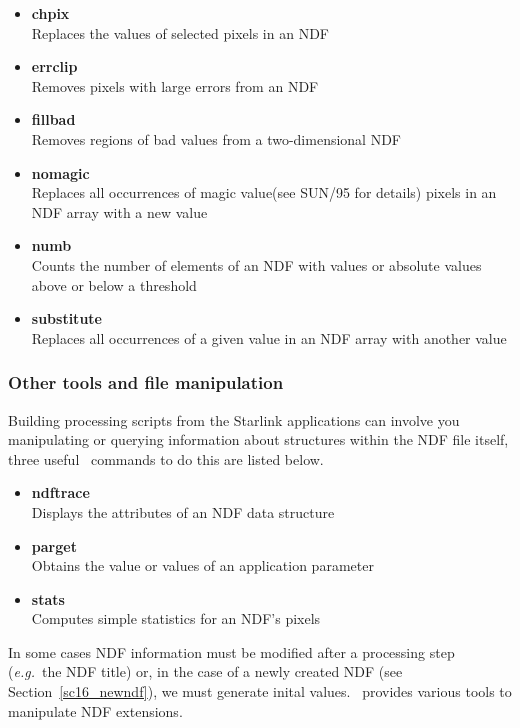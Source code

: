 \documentclass[twoside,11pt]{article}
\newcommand{\htmlref}[2]{#1}
\newcommand{\xref}[3]{#1}
\newcommand{\latex}[1]{#1}
\begin{document}
{\begin{itemize}
\item{\xref{{\bf chpix}}{sun95}{CHPIX}}\\ 
Replaces the values of selected pixels in an NDF 
\item{\xref{{\bf errclip}}{sun95}{ERRCLIP}}\\ 
Removes pixels with large errors from an NDF 
\item{\xref{{\bf fillbad}}{sun95}{FILLBAD}}\\ 
Removes regions of bad values from a two-dimensional NDF 
\item{\xref{{\bf nomagic}}{sun95}{NOMAGIC}}\\ 
Replaces all occurrences of \xref{magic value}{sun95}{se_masking}\latex{(see SUN/95 for details)} 
pixels in an NDF array with a new value 
\item{\xref{{\bf numb}}{sun95}{NUMB}}\\ 
Counts the number of elements of an NDF with values or absolute values above or below a threshold 
\item{\xref{{\bf substitute}}{sun95}{SUBSTITUTE}}\\
Replaces all occurrences of a given value in an NDF array with another value 
\end{itemize}

\subsubsection{Other tools and file manipulation}

Building processing scripts from the Starlink applications can involve
you manipulating or querying information about structures within the
NDF file itself, three useful \KAPPAref\ commands to do this are listed
below.

\begin{itemize}
\item{\xref{{\bf ndftrace}}{sun95}{NDFTRACE}}\\
Displays the attributes of an NDF data structure 
\item{\xref{{\bf parget}}{sun95}{PARGET}}\\
Obtains the value or values of an application parameter 
\item{\xref{{\bf stats}}{sun95}{STATS}}\\
Computes simple statistics for an NDF's pixels  
\end{itemize}  

In some cases NDF information must be modified after a processing step
(\emph{e.g.}\ the NDF title) or, in the case of a \htmlref{newly
created}{sc16_newndf} NDF\latex{ (see Section~\ref{sc16_newndf})},
we must generate inital values.  \KAPPA\ provides various tools to
manipulate NDF extensions.

}
\end{document}
